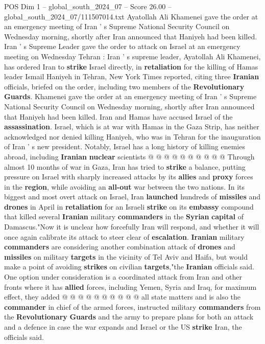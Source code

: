 \begin{textsample}{POS Dim 1 – global\_south\_2024\_07 – Score 26.00 – global\_south\_2024\_07/111507014.txt}  \label{ex:f1_pos_064}
Ayatollah Ali Khamenei gave the order at an emergency meeting of Iran ' s Supreme National Security Council on Wednesday morning, shortly after Iran announced that Haniyeh had been killed.
Iran ' s Supreme Leader gave the order to attack on Israel at an emergency meeting on Wednesday Tehran : Iran ' s supreme leader, Ayatollah Ali Khamenei, has ordered Iran to \textbf{strike} Israel directly, in \textbf{retaliation} for the killing of Hamas leader Ismail Haniyeh in Tehran, New York Times reported, citing three \textbf{Iranian} officials, briefed on the order, including two members of the \textbf{Revolutionary} \textbf{Guards}.
Khamenei gave the order at an emergency meeting of Iran ' s Supreme National Security Council on Wednesday morning, shortly after Iran announced that Haniyeh had been killed.
Iran and Hamas have accused Israel of the \textbf{assassination}.
Israel, which is at war with Hamas in the Gaza Strip, has neither acknowledged nor denied killing Haniyeh, who was in Tehran for the inauguration of Iran ' s new president.
Notably, Israel has a long history of killing enemies abroad, including \textbf{Iranian} \textbf{nuclear} scientists @ @ @ @ @ @ @ @ @ @ Through almost 10 months of war in Gaza, Iran has tried to \textbf{strike} a balance, putting pressure on Israel with sharply increased attacks by its \textbf{allies} and \textbf{proxy} forces in the \textbf{region}, while avoiding an \textbf{all-out} war between the two nations.
In its biggest and most overt attack on Israel, Iran \textbf{launched} hundreds of \textbf{missiles} and \textbf{drones} in April in \textbf{retaliation} for an Israeli \textbf{strike} on its \textbf{embassy} compound that killed several \textbf{Iranian} military \textbf{commanders} in the \textbf{Syrian} \textbf{capital} of Damascus."Now it is unclear how forcefully Iran will respond, and whether it will once again calibrate its attack to steer clear of \textbf{escalation}. \textbf{Iranian} military \textbf{commanders} are considering another combination attack of \textbf{drones} and \textbf{missiles} on military \textbf{targets} in the vicinity of Tel Aviv and Haifa, but would make a point of avoiding \textbf{strikes} on civilian \textbf{targets},"the \textbf{Iranian} officials said.
One option under consideration is a coordinated attack from Iran and other fronts where it has \textbf{allied} forces, including Yemen, Syria and Iraq, for maximum effect, they added @ @ @ @ @ @ @ @ @ @ all state matters and is also the \textbf{commander} in chief of the armed forces, instructed military \textbf{commanders} from the \textbf{Revolutionary} \textbf{Guards} and the army to prepare plans for both an attack and a defence in case the war expands and Israel or the US \textbf{strike} Iran, the officials said.

\end{textsample}
